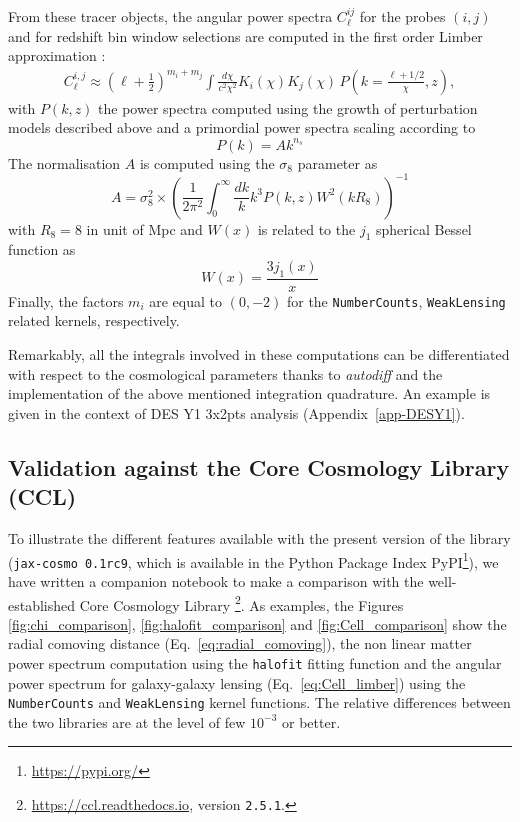 \documentclass[twocolumn,twocolappendix,nofootinbib,iop]{openjournal}
\newcommand{\nblink}[1]{\href{https://github.com/DifferentiableUniverseInitiative/jax-cosmo-paper/blob/master/notebooks/#1.ipynb}{\faFileCodeO}}
\newcommand{\JZ}[1]{{\color{purple}JZ: #1}}
\newcommand{\jaxcosmo}{\texttt{jax-cosmo}}
\begin{document}
From these tracer objects, the angular power spectra $C_\ell^{ij}$ for the probes $(i,j)$ and for redshift bin window selections are computed in the first order Limber approximation \citep{PhysRevD.78.123506}:
\begin{align}
    C_\ell^{i,j} \approx \left(\ell+\frac{1}{2}\right)^{m_i+m_j}\int\frac{d\chi}{c^2\chi^2}K_i(\chi)K_j(\chi)\,P\left(k=\frac{\ell+1/2}{\chi},z\right),\label{eq:Cell_limber}
\end{align}
with $P(k,z)$ the power spectra computed using the growth of perturbation models described above and a primordial power spectra scaling according to
\begin{equation}
    P(k) = A k^{n_s}
\end{equation}
The normalisation $A$ is computed using the $\sigma_8$ parameter as 
\begin{equation}
    A = \sigma_8^2 \times \left(\frac{1}{2 \pi^2} \int_0^\infty \frac{dk}{k} k^3 P(k,z) W^2(kR_8) \right)^{-1}
\end{equation}
with $R_8 = 8$ in unit of Mpc and $W(x)$ is related to the $j_1$ spherical Bessel function as
\begin{equation}
    W(x) = \frac{3j_1(x)}{x}
\end{equation}
Finally, the factors $m_i$ are equal to $(0,-2)$ for the \texttt{NumberCounts}, \texttt{WeakLensing} related kernels, respectively.

Remarkably, all the integrals involved in these computations can be  differentiated with respect to the cosmological parameters thanks to \textit{autodiff} and the implementation of the above mentioned integration quadrature.  An example is given in the context of DES Y1 3x2pts analysis (Appendix~\ref{app-DESY1}).
%
\subsection{Validation against the Core Cosmology Library (CCL)}
%
To illustrate the different features available with the present version of the library (\jaxcosmo\ \texttt{0.1rc9}, which is available in the Python Package Index PyPI\footnote{\url{https://pypi.org/}}), we have written a  companion notebook \nblink{CCL_comparison} to make a comparison with the well-established  Core Cosmology Library \citep{2019ApJS..242....2C}\footnote{\url{https://ccl.readthedocs.io}, version \texttt{2.5.1}.}. As examples, the Figures \ref{fig:chi_comparison},
\ref{fig:halofit_comparison} and \ref{fig:Cell_comparison}
show the radial comoving distance (Eq.~\ref{eq:radial_comoving}), the non linear matter power spectrum computation using the \texttt{halofit} fitting function and the angular power spectrum for galaxy-galaxy lensing (Eq.~\ref{eq:Cell_limber}) using the \texttt{NumberCounts} and \texttt{WeakLensing} kernel functions. The relative differences between the two libraries are at the level of few $10^{-3}$ or better.
\end{document}
